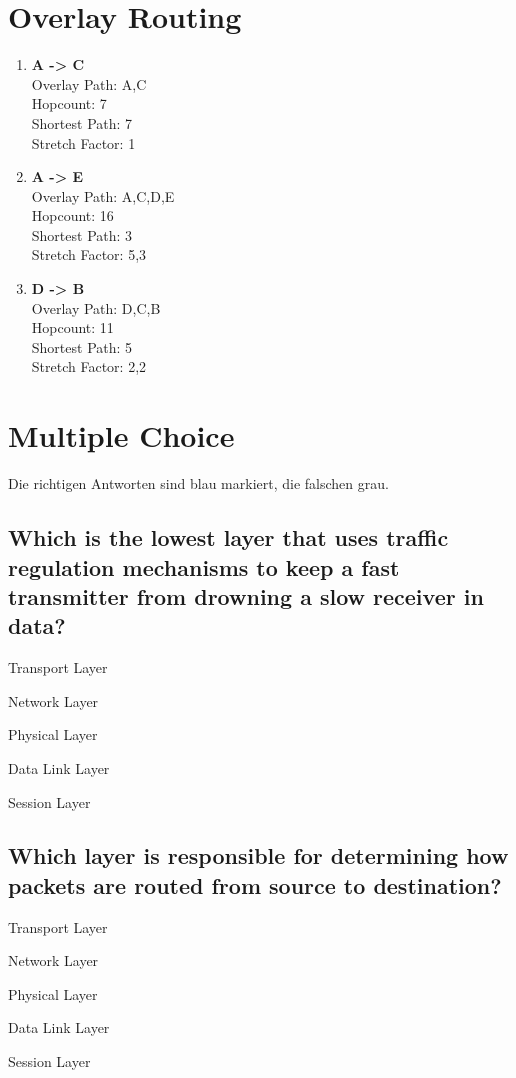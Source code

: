 \documentclass[a4paper,
			llpt,
			solution,
			accentcolor=tud2d,
			colorbacktitle
			]
			{tudexercise}
\newcommand{\8}{$\infty$}
\begin{document}
\section{Overlay Routing}
\begin{enumerate}
\item \textbf{A -> C} \\
Overlay Path: A,C \\
Hopcount: 7 \\
Shortest Path: 7 \\
Stretch Factor: 1

\item \textbf{A -> E} \\
Overlay Path: A,C,D,E \\
Hopcount: 16 \\
Shortest Path: 3 \\
Stretch Factor: 5,3

\item \textbf{D -> B} \\
Overlay Path: D,C,B \\
Hopcount: 11 \\
Shortest Path: 5 \\
Stretch Factor: 2,2

\end{enumerate}
\section{Multiple Choice}
Die richtigen Antworten sind \textcolor{tud2d}{blau} markiert, die falschen \textcolor{litegray}{grau}.
\subsection{Which is the lowest layer that uses traffic regulation mechanisms to keep a fast transmitter from drowning a slow receiver in data?}
\begin{compactenum}
\item Transport Layer
\item Network Layer
\item Physical Layer
\item Data Link Layer
\item Session Layer
\end{compactenum}
\subsection{Which layer is responsible for determining how packets are routed from source to destination?}
\begin{compactenum}
\item Transport Layer
\item Network Layer
\item Physical Layer
\item Data Link Layer
\item Session Layer
\end{compactenum}
\end{document}
